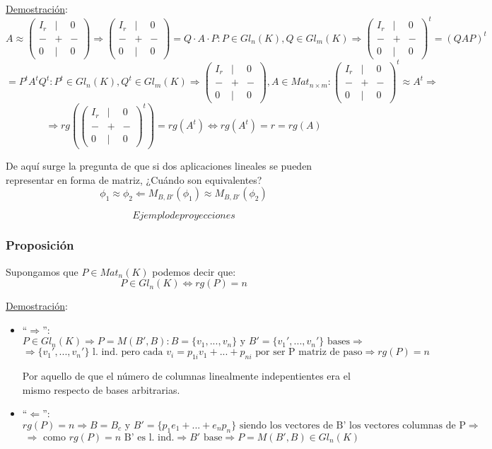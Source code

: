 \documentclass[10pt,a4paper,openright]{book}
\begin{document}
\underline{Demostración}:
$$A\approx \begin{pmatrix}I_r & | & 0  \\ - & + & - \\ 0 & | & 0 \end{pmatrix}\Rightarrow \begin{pmatrix}I_r & | & 0  \\ - & + & - \\ 0 & | & 0 \end{pmatrix}= Q\cdot A \cdot P: P\in Gl_n(K), Q\in Gl_m(K)\Rightarrow \begin{pmatrix}I_r & | & 0  \\ - & + & - \\ 0 & | & 0 \end{pmatrix}^t= (QAP)^t$$
$$=P^tA^tQ^t: P^t\in Gl_n(K), Q^t\in Gl_m(K)\Rightarrow \begin{pmatrix}I_r & | & 0  \\ - & + & - \\ 0 & | & 0 \end{pmatrix}, A\in Mat_{n\times m}: \begin{pmatrix}I_r & | & 0  \\ - & + & - \\ 0 & | & 0 \end{pmatrix}^t \approx A^t \Rightarrow$$
$$\Rightarrow rg\left(\begin{pmatrix}I_r & | & 0  \\ - & + & - \\ 0 & | & 0 \end{pmatrix}^t\right)=rg(A^t)\Leftrightarrow rg(A^t)=r=rg(A)$$

De aquí surge la pregunta de que si dos aplicaciones lineales se pueden representar en forma de matriz, ¿Cuándo son equivalentes?
$$\phi_1\approx \phi_2\Leftarrow M_{B,B'}(\phi_1) \approx M_{B, B'}(\phi_2)$$

$$Ejemplo de proyecciones$$

\subsubsection*{Proposición}
Supongamos que $P\in Mat_n(K)$ podemos decir que:
$$P\in Gl_n(K)\Leftrightarrow rg(P)=n$$

\underline{Demostración}:
\begin{itemize}
\item ``$\Rightarrow $'':
$$P\in Gl_n(K)\Rightarrow P=M(B',B): B=\{v_1, ..., v_n\}\mbox{ y }B'=\{v_1', ..., v_n'\}\mbox{ bases}\Rightarrow $$
$$\Rightarrow \{v_1',..., v_n'\}\mbox{ l. ind. pero cada }v_i=p_{1i}v_1+...+p_{ni}\mbox{ por ser P matriz de paso}\Rightarrow rg(P)=n$$

Por aquello de que el número de columnas linealmente indepentientes era el mismo respecto de bases arbitrarias.


\item ``$\Leftarrow$'':
$$rg(P)=n\Rightarrow B=B_c \mbox{ y }B'=\{p_1e_1+...+e_np_n\}\mbox{ siendo los vectores de B' los vectores columnas de P}\Rightarrow $$
$$\Rightarrow \mbox{ como }rg(P)=n\mbox{ B' es l. ind.}\Rightarrow B'\mbox{ base}\Rightarrow P=M(B',B)\in Gl_n(K)$$

\end{itemize}
\end{document}
